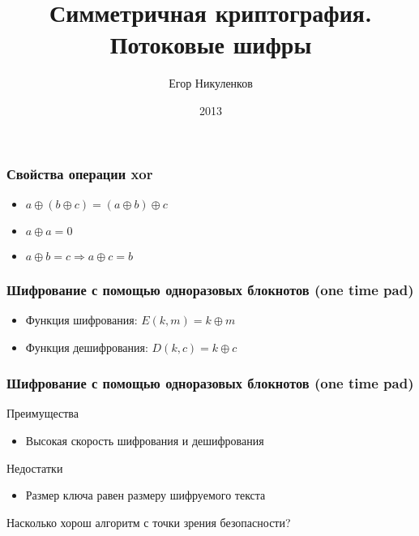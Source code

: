 \documentclass{beamer}
\title{Симметричная криптография. Потоковые шифры}
\author{Егор Никуленков}
\institute{ВГУ}
\date{2013}
\begin{document}
\frame{\titlepage}

\begin{frame}
  \frametitle{Свойства операции xor}

  \begin{itemize}
    \item{$a \oplus (b \oplus c) = (a \oplus b) \oplus c$}
    \item{$a \oplus a = 0$}
    \item{$a \oplus b = c \Rightarrow a \oplus c = b$}
  \end{itemize}
\end{frame}



\begin{frame}
  \frametitle{Шифрование с помощью одноразовых блокнотов (one time pad)}

  \begin{itemize}
    \itemsep 2em
    \item{Функция шифрования: \newline
      $E(k,m)=k \oplus m$}
    \item{Функция дешифрования: \newline
      $D(k,c)=k \oplus c$}

  \end{itemize}

\end{frame}


\begin{frame}
  \frametitle{Шифрование с помощью одноразовых блокнотов (one time pad)}

  \begin{block} {Преимущества}
    \begin{itemize}
      \item{Высокая скорость шифрования и дешифрования}
    \end{itemize}
  \end{block}

  \begin{block} {Недостатки}
    \begin{itemize}
      \item{Размер ключа равен размеру шифруемого текста}
    \end{itemize}
  \end{block}

  \vspace{2 em}
  Насколько хорош алгоритм с точки зрения безопасности?

\end{frame}
\end{document}
